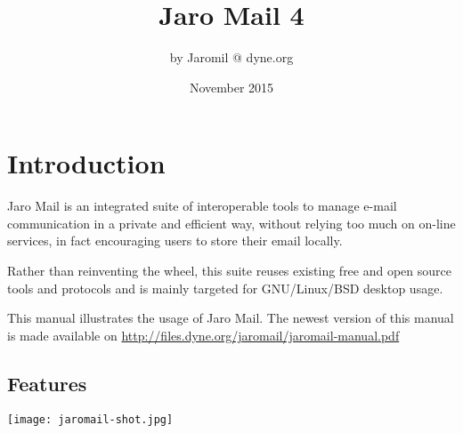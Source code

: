 \documentclass[a4,onecolumn,portrait]{article}
\author{by Jaromil @ dyne.org}
\date{November 2015}
\title{Jaro Mail 4}
\begin{document}
\maketitle
\tableofcontents

\fancyhf{}
\fancyfoot[C]{-- \thepage\ --}

\renewcommand{\headrulewidth}{0.4pt}
\renewcommand{\footrulewidth}{0.4pt}


\pagebreak


\section{Introduction}
\label{sec-1}

Jaro Mail is an integrated suite of interoperable tools to manage
e-mail communication in a private and efficient way, without relying
too much on on-line services, in fact encouraging users to store their
email locally.

Rather than reinventing the wheel, this suite reuses existing free and
open source tools and protocols and is mainly targeted for
GNU/Linux/BSD desktop usage.

This manual illustrates the usage of Jaro Mail. The newest version of
this manual is made available on \url{http://files.dyne.org/jaromail/jaromail-manual.pdf}

\subsection{Features}
\label{sec-1-1}

\texttt{[image: jaromail-shot.jpg]}
\end{document}
